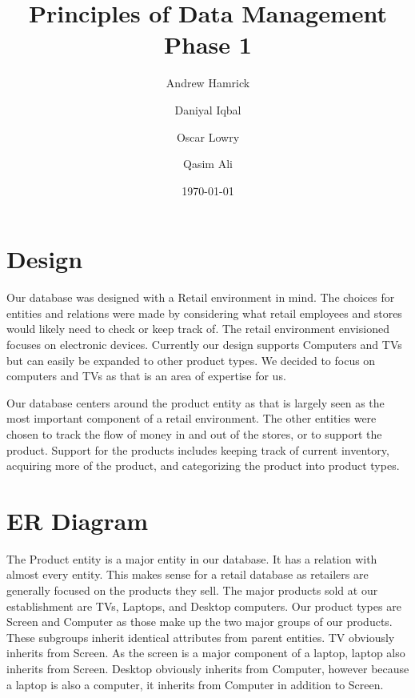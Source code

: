 \documentclass{article}
\title{Principles of Data Management\\\Large Phase 1}
\date{\today}
\author{
	Andrew Hamrick
	\and
	Daniyal Iqbal
	\and
	Oscar Lowry
	\and
	Qasim Ali
}
\begin{document}
	\maketitle
	\newpage

	\section{Design}
		Our database was designed with a Retail environment in mind. The choices for
		entities and relations were made by considering what retail employees and
		stores would likely need to check or keep track of. The retail environment
		envisioned focuses on electronic devices. Currently our design supports
		Computers and TVs but can easily be expanded to other product types. We
		decided to focus on computers and TVs as that is an area of expertise for
		us.\\
		\vspace{0pt}

		Our database centers around the product entity as that is largely seen as
		the most important component of a retail environment. The other entities
		were chosen to track the flow of money in and out of the stores, or to
		support the product. Support for the products includes keeping track of
		current inventory, acquiring more of the product, and categorizing the
		product into product types.

	\section{ER Diagram}
		The Product entity is a major entity in our database. It has a relation with
		almost every entity. This makes sense for a retail database as retailers are
		generally focused on the products they sell. The major products sold at our
		establishment are TVs, Laptops, and Desktop computers. Our product types are
		Screen and Computer as those make up the two major groups of our products.
		These subgroups inherit identical attributes from parent entities.  TV
		obviously inherits from Screen. As the screen is a major component of a
		laptop, laptop also inherits from Screen.  Desktop obviously inherits from
		Computer, however because a laptop is also a computer, it inherits from
		Computer in addition to Screen.
\end{document}

